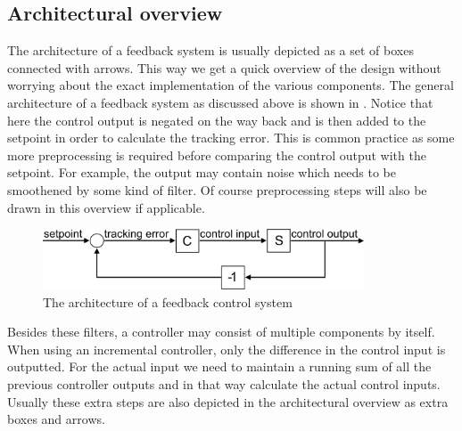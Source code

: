 \subsection{Architectural overview}
The architecture of a feedback system is usually depicted as a set of boxes connected with arrows. This way we get a quick overview of the design without worrying about the exact implementation of the various components. The general architecture of a feedback system as discussed above is shown in . Notice that here the control output is negated on the way back and is then added to the setpoint in order to calculate the tracking error. This is common practice as some more preprocessing is required before comparing the control output with the setpoint. For example, the output may contain noise which needs to be smoothened by some kind of filter. Of course preprocessing steps will also be drawn in this overview if applicable.

\begin{figure}[H]
	\begin{center}
		\includegraphics[width=0.85\textwidth]{figures/FeedbackBig.png}
	\end{center}
	\caption{The architecture of a feedback control system}
	\label{fig:feedbackArchitecture}
\end{figure}

Besides these filters, a controller may consist of multiple components by itself. When using an incremental controller, only the difference in the control input is outputted. For the actual input we need to maintain a running sum of all the previous controller outputs and in that way calculate the actual control inputs. Usually these extra steps are also depicted in the architectural overview as extra boxes and arrows.
